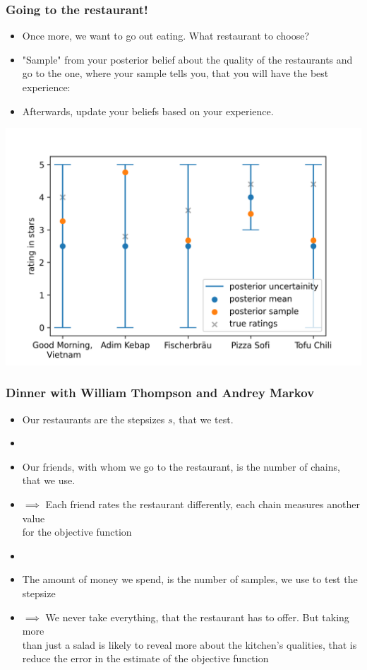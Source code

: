 \begin{frame}[c]
    \frametitle{Going to the restaurant!}
    \begin{itemize}
        \item Once more, we want to go out eating. What restaurant to choose? 
        \item "Sample" from your posterior belief about the quality of the restaurants and go to the one, 
            where your sample tells you, that you will have the best experience:
        \item Afterwards, update your beliefs based on your experience.
    \end{itemize}
    \vspace{-.5cm}
    \begin{center}
        \includegraphics[scale=0.5]{imgs/restaurantsposteriorwsample.png}
    \end{center}
\end{frame}

\begin{frame}[c]
    \frametitle{Dinner with William Thompson and Andrey Markov}
    \begin{itemize}
        \item Our restaurants are the stepsizes $s$, that we test.
        \item[]
        \item Our friends, with whom we go to the restaurant, is the number of chains, that we use.
        \item[] $\implies$ Each friend rates the restaurant differently, each chain measures another value \\
            \phantom{$\implies$} for the objective function
        \item[]
        \item The amount of money we spend, is the number of samples, we use to test the stepsize
        \item[] $\implies$ We never take everything, that the restaurant has to offer. But taking more \\
            \phantom{$\implies$} than just a salad is likely to reveal more about the kitchen's qualities, that is \\
            \phantom{$\implies$} reduce the error in the estimate of the objective function
    \end{itemize}
\end{frame}

